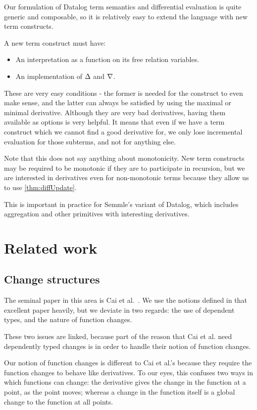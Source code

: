 Our formulation of Datalog term semantics and differential evaluation is quite
generic and composable, so it is relatively easy to extend the language with new
term constructs.

A new term construct must have:
\begin{itemize}
  \item An interpretation as a function on its free relation variables.
  \item An implementation of $\Delta$ and $\nabla$.
\end{itemize}

These are very easy conditions - the former is needed for the construct to even
make sense, and the latter can always be satisfied by using the maximal or
minimal derivative. Although they are very bad derivatives, having them
available as options is very helpful. It means that even if we have a term
construct which we cannot find a good derivative for, we only lose incremental
evaluation for those subterms, and not for anything else.

Note that this does not say anything about monotonicity. New term constructs may
be required to be monotonic if they are to participate in recursion, but we are
interested in derivatives even for non-monotonic terms because they allow us to
use \ref{thm:diffUpdate}.

This is important in practice for Semmle's variant of Datalog, which includes
aggregation and other primitives with interesting derivatives.

\section{Related work}

\subsection{Change structures}

The seminal paper in this area is Cai et al.~\cite{cai2014changes}. We use the notions
defined in that excellent paper heavily, but we deviate in two regards: the use of
dependent types, and the nature of function changes.

These two issues are linked, because part of the reason that Cai et al. need
dependently typed changes is in order to handle their notion of function
changes.

Our notion of function changes is different to Cai et al.'s because they require the
function changes to behave like derivatives. To our eyes, this confuses two ways
in which functions can change: the derivative gives the change in the function
at a point, as the point moves; whereas a change in the function itself is a
global change to the function at all points.

